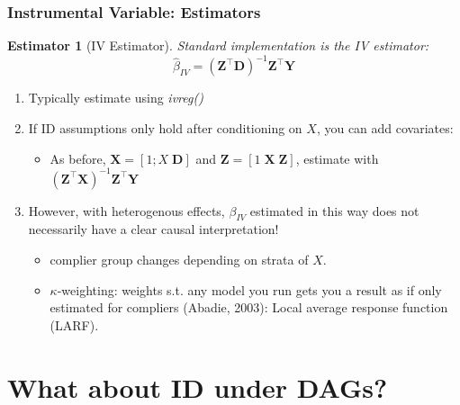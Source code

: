 \documentclass[xcolor=dvipsnames]{beamer}
\newtheorem{esti}{Estimator}
\newcommand{\mb}{\mathbf}
\newcommand{\Z}{\ensuremath{\mb{Z}}}
\newcommand{\X}{\ensuremath{\mb{X}}}
\newcommand{\Y}{\ensuremath{\mb{Y}}}
\newcommand{\D}{\ensuremath{\mb{D}}}
\begin{document}
\begin{frame}
\frametitle{Instrumental Variable: Estimators}
\begin{esti}[IV Estimator]\footnotesize
Standard implementation is the IV estimator:
\[ \hat{\beta}_{IV} = (\Z^{\top} \D)^{-1} \Z^{\top} \Y   \]
\end{esti}
\begin{enumerate}
\item Typically estimate using \textit{ivreg()} 
\item If ID assumptions only hold after conditioning on $X$, you can add covariates:
\begin{itemize}
\item<3-> As before, $\X=[1;X\; \D]$ and $\Z=[1\;\X\;\Z]$, estimate with $(\Z^{\top}\X)^{-1}\Z^{\top}\Y$
\end{itemize}
\item<4-> However, with heterogenous effects, $\beta_{IV}$ estimated in this way does not necessarily have a clear causal interpretation!
\begin{itemize}
\item<5-> complier group changes depending on strata of $X$.
\item<6-> $\kappa$-weighting: weights s.t. any model you run gets you a result as if only estimated for compliers (Abadie, 2003): Local average response function (LARF).
\end{itemize}
\end{enumerate}
\end{frame}

\section{What about ID under DAGs?}
\end{document}
